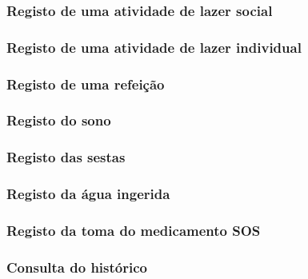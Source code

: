 \subsubsection{Registo de uma atividade de lazer social}
\subsubsection{Registo de uma atividade de lazer individual}
\subsubsection{Registo de uma refeição}
\subsubsection{Registo do sono}
\subsubsection{Registo das sestas}
\subsubsection{Registo da água ingerida}
\subsubsection{Registo da toma do medicamento SOS}
\subsubsection{Consulta do histórico}

